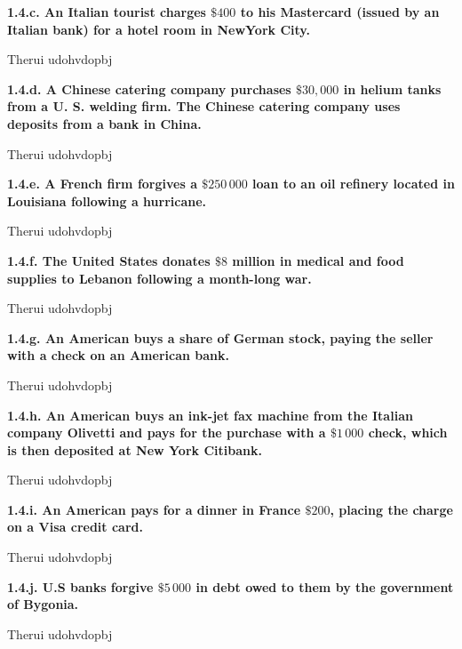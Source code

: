 \documentclass[11pt, a4paper]{article}
\begin{document}
\textbf{1.4.c. An Italian tourist charges $\$400$ to his Mastercard (issued by an Italian bank) for a
hotel room in NewYork City.}

\vspace{0.075in}
Therui udohvdopbj
\vspace{0.075in}

\textbf{1.4.d. A Chinese catering company purchases $\$30,000$ in helium tanks from a U. S. welding
firm. The Chinese catering company uses deposits from a bank in China.}

\vspace{0.075in}
Therui udohvdopbj
\vspace{0.075in}

\textbf{1.4.e. A French firm forgives a $\$250\,000$ loan to an oil refinery located in Louisiana
following a hurricane.}

\vspace{0.075in}
Therui udohvdopbj
\vspace{0.075in}

\textbf{1.4.f. The United States donates $\$8$ million in medical and food supplies to Lebanon
following a month-long war.}

\vspace{0.075in}
Therui udohvdopbj
\vspace{0.075in}

\textbf{1.4.g. An American buys a share of German stock, paying the seller with a check on an
American bank.}

\vspace{0.075in}
Therui udohvdopbj
\vspace{0.075in}

\textbf{1.4.h. An American buys an ink-jet fax machine from the Italian company Olivetti and pays
for the purchase with a $\$1\,000$ check, which is then deposited at New York Citibank.}

\vspace{0.075in}
Therui udohvdopbj
\vspace{0.075in}

\textbf{1.4.i. An American pays for a dinner in France $\$200$, placing the charge on a Visa credit
card.}

\vspace{0.075in}
Therui udohvdopbj
\vspace{0.075in}

\textbf{1.4.j. U.S banks forgive $\$5\,000$ in debt owed to them by the government of Bygonia.}

\vspace{0.075in}
Therui udohvdopbj
\vspace{0.075in}
\end{document}
